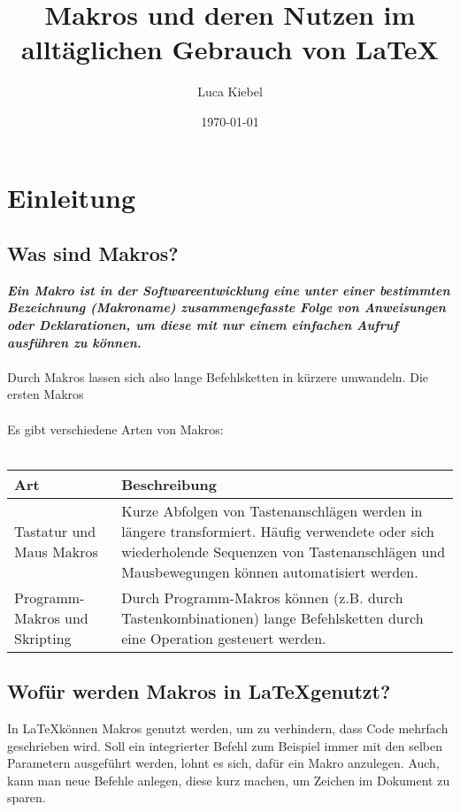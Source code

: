 \documentclass[ngerman,12pt,titlepage]{scrartcl}
\title{Makros und deren Nutzen im alltäglichen Gebrauch von \LaTeX}
\author{Luca Kiebel}
\date{\today}
\begin{document}
\maketitle
\newpage
	\tableofcontents
\newpage

\section{Einleitung}
\label{cha:Einleitung}
\subsection{Was sind Makros?}
\textbf{\textit{Ein Makro ist in der Softwareentwicklung eine unter einer bestimmten Bezeichnung (Makroname) zusammengefasste Folge von Anweisungen oder Deklarationen, um diese mit nur einem einfachen Aufruf ausführen zu können.}} ~\citep{wiki:makro}\\ \\
Durch Makros lassen sich also lange Befehlsketten in kürzere umwandeln. Die ersten Makros 	\\ \\
Es gibt verschiedene Arten von Makros: \\
\vspace{5mm} \\
\begin{tabular}{l|p{}}
	\textbf{Art} & \textbf{ Beschreibung} \\ \hline
	Tastatur und Maus Makros & Kurze Abfolgen von Tastenanschlägen werden in längere transformiert. Häufig verwendete oder sich wiederholende Sequenzen von Tastenanschlägen und Mausbewegungen können automatisiert werden. \\
	Programm-Makros und Skripting & Durch Programm-Makros können (z.B. durch Tastenkombinationen) lange Befehlsketten durch eine Operation gesteuert werden. \\
\end{tabular}


\subsection{Wofür werden Makros in \LaTeX  genutzt?}
In \LaTeX  können Makros genutzt werden{,} um zu verhindern{,} dass Code mehrfach geschrieben wird. Soll ein integrierter Befehl zum Beispiel immer mit den selben Parametern ausgeführt werden{,} lohnt es sich{,} dafür ein Makro anzulegen. Auch{,} kann man neue Befehle anlegen, diese kurz machen{,} um Zeichen im Dokument zu sparen.


\newpage
\printbibliography
\end{document}
